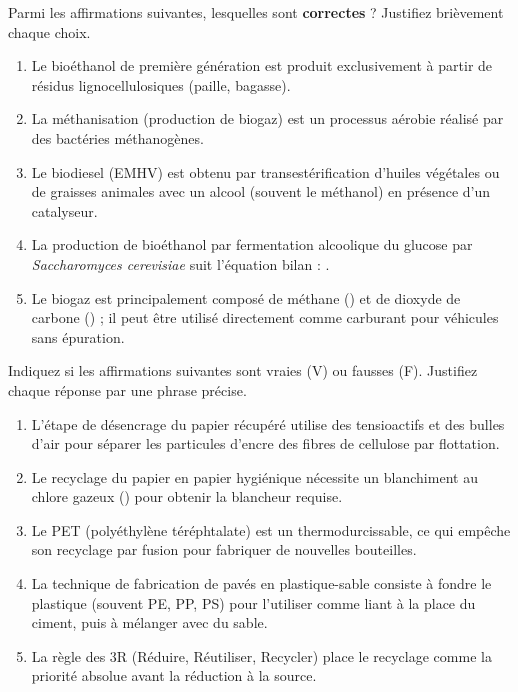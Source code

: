 \documentclass[11pt]{article}
\begin{document}
\begin{exercice}
Parmi les affirmations suivantes, lesquelles sont \textbf{correctes} ? Justifiez brièvement chaque choix.
\begin{enumerate}
    \item Le bioéthanol de première génération est produit exclusivement à partir de résidus lignocellulosiques (paille, bagasse).
    \item La méthanisation (production de biogaz) est un processus aérobie réalisé par des bactéries méthanogènes.
    \item Le biodiesel (EMHV) est obtenu par transestérification d'huiles végétales ou de graisses animales avec un alcool (souvent le méthanol) en présence d'un catalyseur.
    \item La production de bioéthanol par fermentation alcoolique du glucose par \emph{Saccharomyces cerevisiae} suit l'équation bilan : .
    \item Le biogaz est principalement composé de méthane () et de dioxyde de carbone () ; il peut être utilisé directement comme carburant pour véhicules sans épuration.
\end{enumerate}
\end{exercice}

\begin{exercice}
Indiquez si les affirmations suivantes sont vraies (V) ou fausses (F). Justifiez chaque réponse par une phrase précise.
\begin{enumerate}
    \item L'étape de désencrage du papier récupéré utilise des tensioactifs et des bulles d'air pour séparer les particules d'encre des fibres de cellulose par flottation.
    \item Le recyclage du papier en papier hygiénique nécessite un blanchiment au chlore gazeux () pour obtenir la blancheur requise.
    \item Le PET (polyéthylène téréphtalate) est un thermodurcissable, ce qui empêche son recyclage par fusion pour fabriquer de nouvelles bouteilles.
    \item La technique de fabrication de pavés en plastique-sable consiste à fondre le plastique (souvent PE, PP, PS) pour l'utiliser comme liant à la place du ciment, puis à mélanger avec du sable.
    \item La règle des 3R (Réduire, Réutiliser, Recycler) place le recyclage comme la priorité absolue avant la réduction à la source.
\end{enumerate}
\end{exercice}
\end{document}
